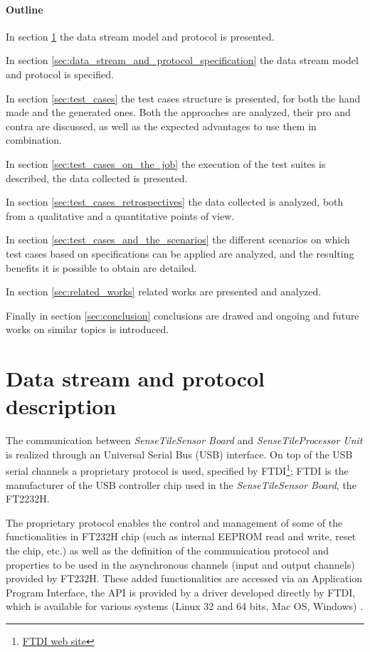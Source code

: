 \documentclass{article}
\newcommand{\myhref}[2]{\ifpdf\href{#1}{#2}\else\htmladdnormallinkfoot{#2}{#1}\fi}
\newcommand{\ST}{\emph{SenseTile}\xspace}
\newcommand{\STSB}{\ST \emph{Sensor Board}\xspace}
\newcommand{\STPU}{\ST \emph{Processor Unit}\xspace}
\begin{document}
\paragraph*{Outline}

In section \ref{sec:data_stream_and_protocol_description} the data stream model 
and protocol is presented.

In section \ref{sec:data_stream_and_protocol_specification} the data stream model 
and protocol is specified.

In section \ref{sec:test_cases} the test cases structure is presented, for 
both the hand made and the generated ones. 
Both the approaches are analyzed, their pro and contra are discussed, as 
well as the expected advantages to use them in combination.

In section \ref{sec:test_cases_on_the_job} the execution of the test suites
is described, the data collected is presented.

In section \ref{sec:test_cases_retrospectives} the data collected is analyzed, 
both from a qualitative and a quantitative points of view.

In section \ref{sec:test_cases_and_the_scenarios} the different scenarios on 
which test cases based on specifications can be applied are analyzed, and 
the resulting benefits it is possible to obtain are detailed.

In section \ref{sec:related_works} related works are presented and analyzed.

Finally in section \ref{sec:conclusion} conclusions are drawed and 
ongoing and future works on similar topics is introduced.



\section{Data stream and protocol description}
\label{sec:data_stream_and_protocol_description}

The communication between \STSB and \STPU is realized through an Universal 
Serial Bus (USB) interface.
On top of the USB serial channels a proprietary protocol is used, specified by 
FTDI\footnote{\myhref{http://www.ftdichip.com/}{FTDI web site}}; FTDI is the 
manufacturer of the USB controller chip used in the \STSB, the 
FT2232H\cite{ftdi_ft232h_2009}.

The proprietary protocol enables the control and management of some of the 
functionalities in FT232H chip (such as internal EEPROM read and write, reset 
the chip, etc.) as well as the definition of the communication protocol and 
properties to be used in the asynchronous channels (input and output channels) 
provided by FT232H.
These added functionalities are accessed via an Application Program Interface,
the API is provided by a driver developed directly by FTDI, which is available 
for various systems (Linux 32 and 64 bits, Mac OS, Windows)
\cite{ftdi_d2xx_api_2009}.
\end{document}
